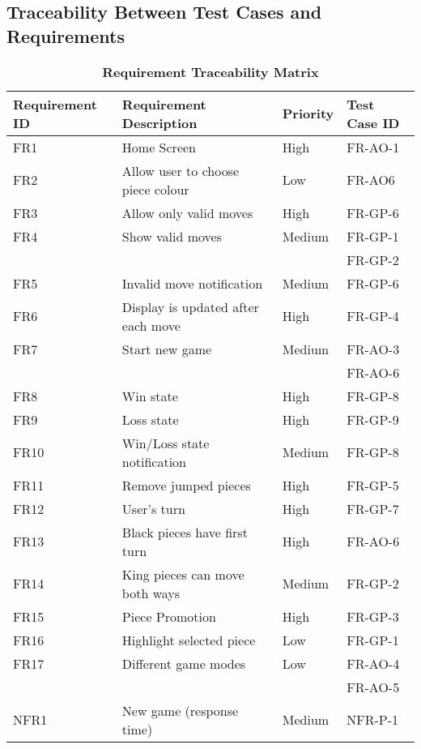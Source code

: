 \documentclass[12pt, titlepage]{article}
\begin{document}
\subsection{Traceability Between Test Cases and Requirements}
\newpage
\begin{table}[htbp]
    \begin{center}
	\caption{\bf Requirement Traceability Matrix}
	\begin{adjustwidth}{-1.5cm}{}
	\begin{tabularx}{1.2\textwidth}{|p{3.4cm}|p{7cm}|p{1.6cm}|X|}
		\hline 
		{\bf Requirement ID}  & {\bf Requirement Description} & {\bf Priority} & {\bf Test Case ID} \\
		\hline
		FR1 & Home Screen & High & FR-AO-1\\
		\hline
		FR2 & Allow user to choose piece colour & Low & FR-AO6\\
		\hline
		FR3 & Allow only valid moves & High & FR-GP-6\\
		\hline
		FR4 & Show valid moves & Medium & FR-GP-1\\
		& & & FR-GP-2\\
		\hline
		FR5 & Invalid move notification & Medium & FR-GP-6\\
		\hline
		FR6 & Display is updated after each move & High & FR-GP-4\\
		\hline
		FR7 & Start new game & Medium & FR-AO-3\\
		& & & FR-AO-6\\
		\hline
		FR8 & Win state & High & FR-GP-8 \\
		\hline
		FR9 & Loss state & High & FR-GP-9 \\
		\hline
		FR10 & Win/Loss state notification & Medium & FR-GP-8 \\
		\hline
		FR11 & Remove jumped pieces & High & FR-GP-5\\
		\hline
		FR12 & User's turn & High & FR-GP-7\\
		\hline
		FR13 & Black pieces have first turn & High &  FR-AO-6\\
		\hline
		FR14 & King pieces can move both ways & Medium & FR-GP-2\\
		\hline
		FR15 & Piece Promotion & High & FR-GP-3\\
		\hline
		FR16 & Highlight selected piece & Low & FR-GP-1\\
		\hline
		FR17 & Different game modes & Low & FR-AO-4\\
	     &  &  & FR-AO-5\\
		\hline
		\hline
		NFR1 & New game (response time) & Medium & NFR-P-1 \\

\end{tabularx}
\end{adjustwidth}
\end{center}
\end{table}
\end{document}
